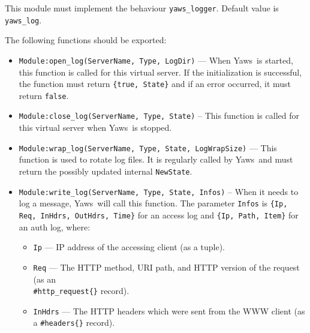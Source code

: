 \documentclass[11pt,oneside,english]{book}
\newcommand{\Yaws}            %
        {{\sc Yaws}}
\begin{document}
\begin{itemize}
              This module must implement the behaviour
              \verb+yaws_logger+. Default value is \verb+yaws_log+.

              The following functions should be exported:

              \begin{itemize}

              \item \verb+Module:open_log(ServerName, Type, LogDir)+ --- When
                \Yaws\ is started, this function is called for this virtual
                server. If the initialization is successful, the function must
                return \verb+{true, State}+ and if an error occurred, it must
                return \verb+false+.

              \item \verb+Module:close_log(ServerName, Type, State)+ -- This
                function is called for this virtual server when
                \Yaws\ is stopped.

              \item \verb+Module:wrap_log(ServerName, Type, State, LogWrapSize)+
                --- This function is used to rotate log files. It is regularly
                called by \Yaws\ and must return the possibly updated internal
                \verb+NewState+.

              \item \verb+Module:write_log(ServerName, Type, State, Infos)+ --
                When it needs to log a message, \Yaws\ will call this
                function. The parameter \verb+Infos+ is
                \verb+{Ip, Req, InHdrs, OutHdrs, Time}+ for an access log and
                \verb+{Ip, Path, Item}+ for an auth log, where:

                      \begin{itemize}
                      \item \verb+Ip+ --- IP address of the accessing client (as
                        a tuple).

                      \item \verb+Req+ --- The HTTP method, URI path, and HTTP
                        version of the request (as an\\ \verb+#http_request{}+
                        record).

                      \item \verb+InHdrs+ --- The HTTP headers which were sent
                        from the WWW client (as a \verb+#headers{}+ record).


\end{itemize}
\end{itemize}
\end{itemize}
\end{document}
